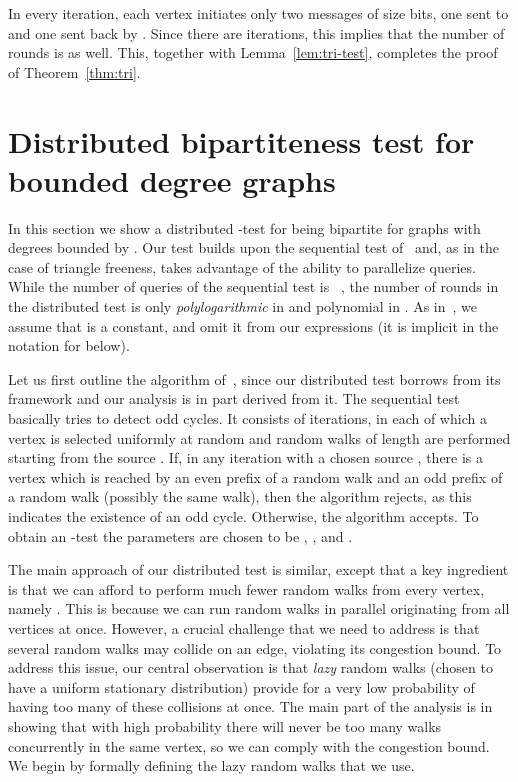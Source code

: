 \documentclass[11pt]{article}
\begin{document}
In every iteration, each vertex initiates only two messages of size  bits, one sent to
 and one sent back by . Since there are  iterations, this implies that the
number of rounds is  as well. This, together with Lemma~\ref{lem:tri-test},
completes the proof of Theorem~\ref{thm:tri}.


\section{Distributed bipartiteness test for bounded degree graphs}
\label{sec:bi}
In this section we show a distributed -test for being bipartite for graphs with degrees bounded by .
Our test builds upon the sequential test of~\cite{GR99} and, as in the case of triangle freeness, takes advantage of the ability to parallelize queries. While the number of queries of the sequential test is ~\cite{GoldreichR02}, the number of rounds in the distributed test is only \emph{polylogarithmic} in  and polynomial in . As in~\cite{GR99}, we assume that  is a constant, and omit it from our expressions (it is implicit in the  notation for  below).

Let us first outline the algorithm of~\cite{GR99}, since our distributed test borrows from its framework and our analysis is in part derived from it. The sequential test basically tries to detect odd cycles. It consists of  iterations, in each of which a vertex  is selected uniformly at random and  random walks of length  are performed starting from the source . If, in any iteration with a chosen source , there is a vertex  which is reached by an even prefix of a random walk and an odd prefix of a random walk (possibly the same walk), then the algorithm rejects, as this indicates the existence of an odd cycle. Otherwise, the algorithm accepts.
To obtain an -test the parameters are chosen to be , , and .

The main approach of our distributed test is similar, except that a key ingredient is that we can afford to perform much fewer random walks from every vertex, namely . This is because we can run random walks in parallel originating from all vertices at once. However, a crucial challenge that we need to address is that several random walks may collide on an edge, violating its congestion bound. To address this issue, our central observation is that \emph{lazy} random walks (chosen to have a uniform stationary distribution) provide for a very low probability of having too many of these collisions at once. The main part of the analysis is in showing that with high probability there will never be too many walks concurrently in the same vertex, so we can comply with the congestion bound. We begin by formally defining the lazy random walks that we use.
\end{document}
